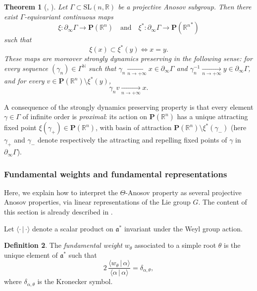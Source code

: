 \documentclass[JEP,XML,SOM,Unicode,NoEqCountersInSection,NoFloatCountersInSection,published]{cedram}
\newcommand{\quand}{\quad\text{and}\quad}
\newtheorem{theo}{Theorem}[section]
\theoremstyle{definition}
\newtheorem{defi}[theo]{Definition}
\newcommand{\proj}{\mathbf{P}}
\newcommand{\R}{\mathbb{R}}
\newcommand{\N}{\mathbb{N}}
\newcommand{\SL}{\mathrm{SL}}
\newcommand{\fa}{\mathfrak{a}}
\newcommand{\scal}[2]{\langle #1\, |\, #2 \rangle }
\let\G\Gamma
\let\g\gamma
\begin{document}
\begin{theo}[\cite{labourie2006anosov}, \cite{kapovich2017anosov}] \label{theo - AnosovLimitMaps}
Let $\G\subset \SL(n,\R)$ be a projective Anosov subgroup. Then there exist $\G$-equivariant continuous maps\vspace*{-3pt}
\[
\xi: \partial_\infty \Gamma \to \proj(\R^n)\quand \xi^*: \partial_\infty \Gamma \to \proj({\R^n}^*)
\]
such that
\[\xi(x)\subset \xi^*(y) \iff x = y.\]
These maps are moreover \emph{strongly dynamics preserving} in the following sense: for every sequence $(\g_n)\in \Gamma^\N$ such that $\g_n\underset{n\to +\infty}{\longrightarrow} x \in \partial_\infty \Gamma$ and $\g_n^{-1}\underset{n\to +\infty}{\longrightarrow} y \in \partial_\infty \Gamma$, and for every $v\in \proj(\R^n) \setminus \xi^*(y)$,\vspace*{-3pt}
\[\g_n v \underset{n\to +\infty}{\longrightarrow} x.\]
\end{theo}
A consequence of the strongly dynamics preserving property is that every element $\g\in \G$ of infinite order is \emph{proximal}: its action on $\proj(\R^n)$ has a unique attracting fixed point $\xi(\g_+)\in \proj(\R^n)$, with basin of attraction $\proj(\R^n) \setminus \xi^*(\g_-)$ (here $\g_+$ and $\g_-$ denote respectively the attracting and repelling fixed points of $\g$ in $\partial_\infty \Gamma$).

\subsubsection{Fundamental weights and fundamental representations} \label{subsec - fundamental weights and fundamental representations}
Here, we explain how to interpret the $\Theta$-Anosov property as several projective Anosov properties, via linear representations of the Lie group $G$. The content of this section is already described in \cite[\S 3]{gueritaud20017anosov}.

Let $\scal{\cdot}{\cdot}$ denote a scalar product on $\fa^*$ invariant under the Weyl group action.
\begin{defi}
The \emph{fundamental weight} $w_\theta$ associated to a simple root $\theta$ is the unique element of $\fa^*$ such that\vspace*{-3pt}
\[2\,\frac{\scal{w_\theta}{\alpha}}{\scal{\alpha}{\alpha}}= \delta_{\alpha,\theta},\]
where $\delta_{\alpha,\theta}$ is the Kronecker symbol.
\end{defi}
\end{document}
